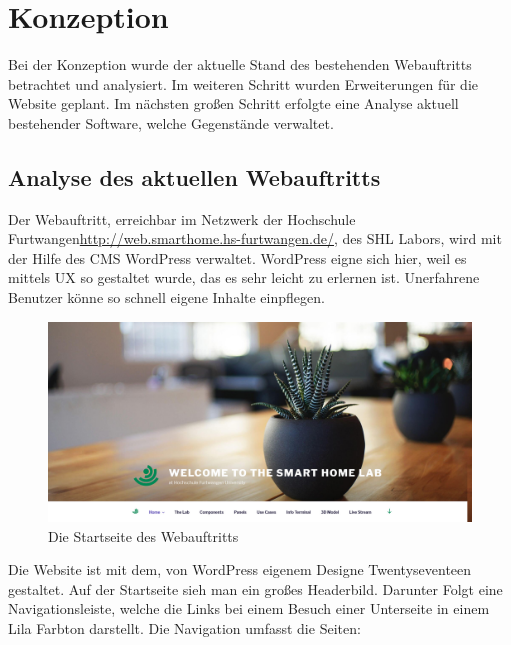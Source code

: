 \chapter{Konzeption}
\label{cha:konzeption}
Bei der Konzeption wurde der aktuelle Stand des bestehenden Webauftritts betrachtet und analysiert. Im weiteren Schritt wurden Erweiterungen für die Website geplant. Im nächsten großen Schritt erfolgte eine Analyse aktuell bestehender Software, welche Gegenstände verwaltet.


\section{Analyse des aktuellen Webauftritts}
\label{webauftritt}
Der Webauftritt, erreichbar im Netzwerk der Hochschule Furtwangen\url{http://web.smarthome.hs-furtwangen.de/}, des \ac{SHL} Labors, wird mit der Hilfe des \ac{CMS} WordPress verwaltet. WordPress eigne sich hier, weil es mittels \ac{UX} so gestaltet wurde, das es sehr leicht zu erlernen ist. Unerfahrene Benutzer könne so schnell eigene Inhalte einpflegen.

\begin{figure}[bh]
	\centering
	\includegraphics[scale=0.23]{content/pictures/shlwebsit.jpg}
	\caption{Die Startseite des Webauftritts}
	\label{fig:web}
\end{figure}

Die Website ist mit dem, von WordPress eigenem Designe Twentyseventeen gestaltet. Auf der Startseite sieh man ein großes Headerbild. Darunter Folgt eine Navigationsleiste, welche die Links bei einem Besuch einer Unterseite in einem Lila Farbton darstellt. Die Navigation umfasst die Seiten:

